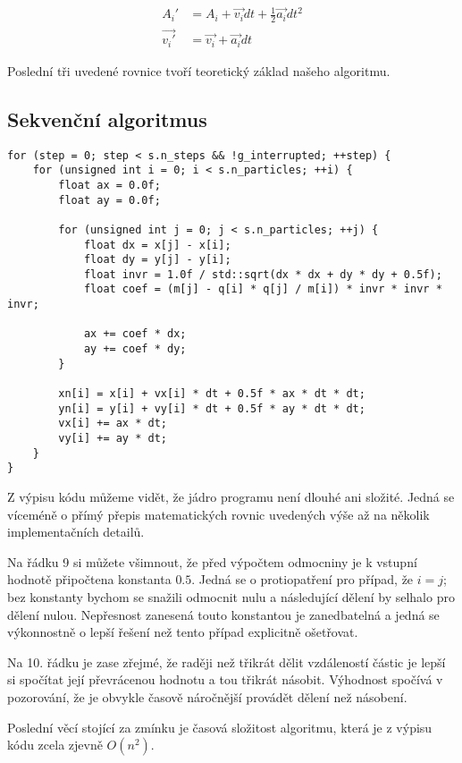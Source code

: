 \documentclass[10pt,a4paper]{article}
\begin{document}
\begin{align*}
A_i' &= A_i + \vec{v_i} dt + \frac{1}{2}\vec{a_i} dt^2 \\
\vec{v_i'} &= \vec{v_i} + \vec{a_i} dt
\end{align*}

Poslední tři uvedené rovnice tvoří teoretický základ našeho algoritmu.

\subsection{Sekvenční algoritmus}

\begin{lstlisting}
for (step = 0; step < s.n_steps && !g_interrupted; ++step) {
    for (unsigned int i = 0; i < s.n_particles; ++i) {
        float ax = 0.0f;
        float ay = 0.0f;

        for (unsigned int j = 0; j < s.n_particles; ++j) {
            float dx = x[j] - x[i];
            float dy = y[j] - y[i];
            float invr = 1.0f / std::sqrt(dx * dx + dy * dy + 0.5f);
            float coef = (m[j] - q[i] * q[j] / m[i]) * invr * invr * invr;

            ax += coef * dx;
            ay += coef * dy;
        }

        xn[i] = x[i] + vx[i] * dt + 0.5f * ax * dt * dt;
        yn[i] = y[i] + vy[i] * dt + 0.5f * ay * dt * dt;
        vx[i] += ax * dt;
        vy[i] += ay * dt;
    }
}
\end{lstlisting}

Z výpisu kódu můžeme vidět, že jádro programu není dlouhé ani složité. Jedná
se víceméně o přímý přepis matematických rovnic uvedených výše až na několik
implementačních detailů.

Na řádku 9 si můžete všimnout, že před výpočtem odmocniny je k vstupní
hodnotě připočtena konstanta $ 0.5 $. Jedná se o protiopatření pro případ,
že $ i = j $; bez konstanty bychom se snažili odmocnit nulu a následující
dělení by selhalo pro dělení nulou. Nepřesnost zanesená touto konstantou
je zanedbatelná a jedná se výkonnostně o lepší řešení než tento případ
explicitně ošetřovat.

Na 10. řádku je zase zřejmé, že raději než třikrát dělit vzdáleností částic
je lepší si spočítat její převrácenou hodnotu a tou třikrát násobit. Výhodnost
spočívá v pozorování, že je obvykle časově náročnější provádět dělení než
násobení.

Poslední věcí stojící za zmínku je časová složitost algoritmu, která
je z výpisu kódu zcela zjevně $ O(n^2) $.
\end{document}
